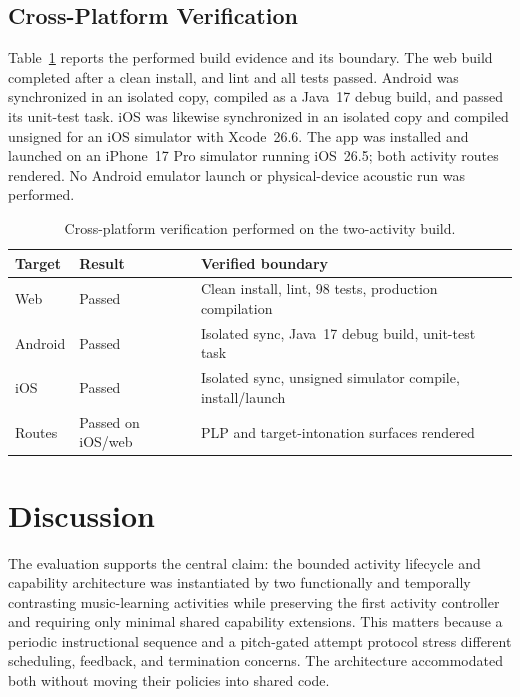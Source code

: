 \documentclass[runningheads]{llncs}
\begin{document}
\subsection{Cross-Platform Verification}

Table~\ref{tab:platform} reports the performed build evidence and its boundary.
The web build completed after a clean install, and lint and all tests passed.
Android was synchronized in an isolated copy, compiled as a Java~17 debug
build, and passed its unit-test task. iOS was likewise synchronized in an
isolated copy and compiled unsigned for an iOS simulator with Xcode~26.6. The
app was installed and launched on an iPhone~17 Pro simulator running
iOS~26.5; both activity routes rendered. No Android emulator launch or
physical-device acoustic run was performed.

\begin{table}[t]
\caption{Cross-platform verification performed on the two-activity build.}
\label{tab:platform}
\centering
\small
\begin{tabularx}{\textwidth}{@{}l l X@{}}
\toprule
Target & Result & Verified boundary\\
\midrule
Web & Passed & Clean install, lint, 98 tests, production compilation\\
Android & Passed & Isolated sync, Java~17 debug build, unit-test task\\
iOS & Passed & Isolated sync, unsigned simulator compile, install/launch\\
Routes & Passed on iOS/web & PLP and target-intonation surfaces rendered\\
\bottomrule
\end{tabularx}
\end{table}

\section{Discussion}\label{sec:discussion}

The evaluation supports the central claim: the bounded activity lifecycle and
capability architecture was instantiated by two functionally and temporally
contrasting music-learning activities while preserving the first activity
controller and requiring only minimal shared capability extensions. This
matters because a periodic instructional sequence and a pitch-gated attempt
protocol stress different scheduling, feedback, and termination concerns. The
architecture accommodated both without moving their policies into shared code.
\end{document}
